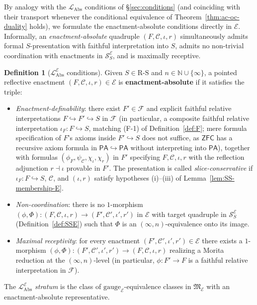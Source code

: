 \documentclass[11pt]{article}
\theoremstyle{plain}
\theoremstyle{definition}
\newtheorem{definition}[theorem]{Definition}
\newcommand{\RS}{\mathrm{R\text{-}S}}
\newcommand{\cS}{\mathcal{S}}
\newcommand{\cF}{\mathcal{F}}
\newcommand{\cC}{\mathcal{C}}
\newcommand{\fM}{\mathfrak{M}}
\newcommand{\LAbs}{\mathcal{L}_{\mathrm{Abs}}}
\newcommand{\PA}{\mathsf{PA}}
\newcommand{\ZFC}{\mathsf{ZFC}}
\newcommand{\cE}{\mathcal{E}}
\newcommand{\LAbsE}{\LAbs^{\cE}}
\newcommand{\SSE}{\cS_{S}^{\cE}}
\begin{document}
By analogy with the $\LAbs$ conditions of \S\ref{sec:conditions} (and coinciding with their transport whenever the conditional equivalence of Theorem~\ref{thm:ac-oc-duality} holds), we formulate the enactment-absolute conditions directly in $\cE$. Informally, an \emph{enactment-absolute} quadruple $(F, \cC, \iota, r)$ simultaneously admits formal $S$-presentation with faithful interpretation into $S$, admits no non-trivial coordination with enactments in $\SSE$, and is maximally receptive.

\begin{definition}[$\LAbsE$ conditions]\label{def:level6-cE}
Given $S \in \RS$ and $n \in \mathbb{N} \cup \{\infty\}$, a pointed reflective enactment $(F, \cC, \iota, r) \in \cE$ is \textbf{enactment-absolute} if it satisfies the triple:
\begin{itemize}
\item[$(\tilde{F}_S)$] \emph{Enactment-definability}: there exist $F' \in \cF$ and explicit faithful relative interpretations $F \hookrightarrow F' \hookrightarrow S$ in $\cF$ (in particular, a composite faithful relative interpretation $\iota_F : F \hookrightarrow S$, matching (F-1) of Definition~\ref{def:F}; mere formula specification of $F$'s axioms inside $F' \hookrightarrow S$ does not suffice, as $\ZFC$ has a recursive axiom formula in $\PA \hookrightarrow \PA$ without interpreting into $\PA$), together with formulas $(\phi_F, \psi_\cC, \chi_\iota, \chi_r)$ in $F'$ specifying $F, \cC, \iota, r$ with the reflection adjunction $r \dashv \iota$ provable in $F'$. The presentation is called \emph{slice-conservative} if $\iota_F : F \hookrightarrow S$, $\cC$, and $(\iota, r)$ satisfy hypotheses (i)--(iii) of Lemma~\ref{lem:SS-membership-E}.
\item[$(\tilde{\Pi}_{4, S, n})$] \emph{Non-coordination}: there is no $1$-morphism $(\phi, \Phi) : (F, \cC, \iota, r) \to (F', \cC', \iota', r')$ in $\cE$ with target quadruple in $\SSE$ (Definition~\ref{def:SSE}) such that $\Phi$ is an $(\infty, n)$-equivalence onto its image.
\item[$(\tilde{\Pi}_{3\text{-max}, S, n})$] \emph{Maximal receptivity}: for every enactment $(F', \cC', \iota', r') \in \cE$ there exists a $1$-morphism $(\phi, \Phi) : (F', \cC', \iota', r') \to (F, \cC, \iota, r)$ realizing a Morita reduction at the $(\infty, n)$-level (in particular, $\phi : F' \to F$ is a faithful relative interpretation in $\cF$).
\end{itemize}
The \emph{$\LAbsE$ stratum} is the class of $\mathrm{gauge}_\cE$-equivalence classes in $\fM_\cE$ with an enactment-absolute representative.
\end{definition}
\end{document}
